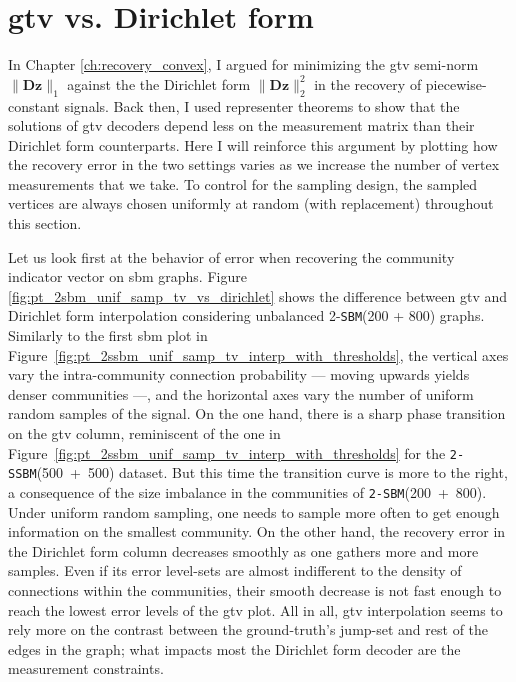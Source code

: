 \section{\texorpdfstring{\acrfull{gtv}}{Graph Total Variation} vs. Dirichlet form}

In Chapter \ref{ch:recovery_convex}, I argued for minimizing the \acrshort{gtv} semi-norm $\|\mathbf{Dz}\|_1$ against the the Dirichlet form $\| \mathbf{Dz} \|_2^2$ in the recovery of piecewise-constant signals. Back then, I used representer theorems to show that the solutions of \acrshort{gtv} decoders depend less on the measurement matrix than their Dirichlet form counterparts. Here I will reinforce this argument by plotting how the recovery error in the two settings varies as we increase the number of vertex measurements that we take. To control for the sampling design, the sampled vertices are always chosen uniformly at random (with replacement) throughout this section.

Let us look first at the behavior of error when recovering the community indicator vector on \acrshort{sbm} graphs. Figure \ref{fig:pt_2sbm_unif_samp_tv_vs_dirichlet} shows the difference between \acrshort{gtv} and Dirichlet form interpolation considering unbalanced 2-\texttt{SBM}(200 + 800) graphs. Similarly to the first \acrshort{sbm} plot in Figure~\ref{fig:pt_2ssbm_unif_samp_tv_interp_with_thresholds}, the vertical axes vary the intra-community connection probability --- moving upwards yields denser communities ---, and the horizontal axes vary the number of uniform random samples of the signal. On the one hand, there is a sharp phase transition on the \acrshort{gtv} column, reminiscent of the one in Figure~\ref{fig:pt_2ssbm_unif_samp_tv_interp_with_thresholds} for the \texttt{2-SSBM}(500~+~500) dataset. But this time the transition curve is more to the right, a consequence of the size imbalance in the communities of \texttt{2-SBM}(200~+~800). Under uniform random sampling, one needs to sample more often to get enough information on the smallest community. On the other hand, the recovery error in the Dirichlet form column decreases smoothly as one gathers more and more samples. Even if its error level-sets are almost indifferent to the density of connections within the communities, their smooth decrease is not fast enough to reach the lowest error levels of the \acrshort{gtv} plot. All in all, \acrshort{gtv} interpolation seems to rely more on the contrast between the ground-truth's jump-set and rest of the edges in the graph; what impacts most the Dirichlet form decoder are the measurement constraints.

